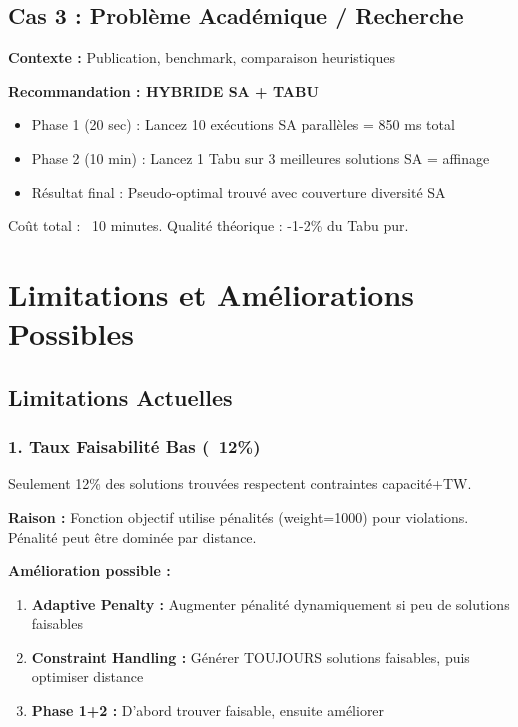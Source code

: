 \documentclass[12pt,a4paper,twoside]{report}
\begin{document}
\subsection{Cas 3 : Problème Académique / Recherche}

\textbf{Contexte :} Publication, benchmark, comparaison heuristiques

\textbf{Recommandation : HYBRIDE SA + TABU}

\begin{itemize}
    \item Phase 1 (20 sec) : Lancez 10 exécutions SA parallèles = 850 ms total
    \item Phase 2 (10 min) : Lancez 1 Tabu sur 3 meilleures solutions SA = affinage
    \item Résultat final : Pseudo-optimal trouvé avec couverture diversité SA
\end{itemize}

Coût total : ~10 minutes. Qualité théorique : -1-2\% du Tabu pur.

\section{Limitations et Améliorations Possibles}

\subsection{Limitations Actuelles}

\subsubsection{1. Taux Faisabilité Bas (~12\%)}

Seulement 12\% des solutions trouvées respectent contraintes capacité+TW.

\textbf{Raison :} Fonction objectif utilise pénalités (weight=1000) pour violations. Pénalité peut être dominée par distance.

\textbf{Amélioration possible :}
\begin{enumerate}
    \item \textbf{Adaptive Penalty :} Augmenter pénalité dynamiquement si peu de solutions faisables
    \item \textbf{Constraint Handling :} Générer TOUJOURS solutions faisables, puis optimiser distance
    \item \textbf{Phase 1+2 :} D'abord trouver faisable, ensuite améliorer
\end{enumerate}
\end{document}
